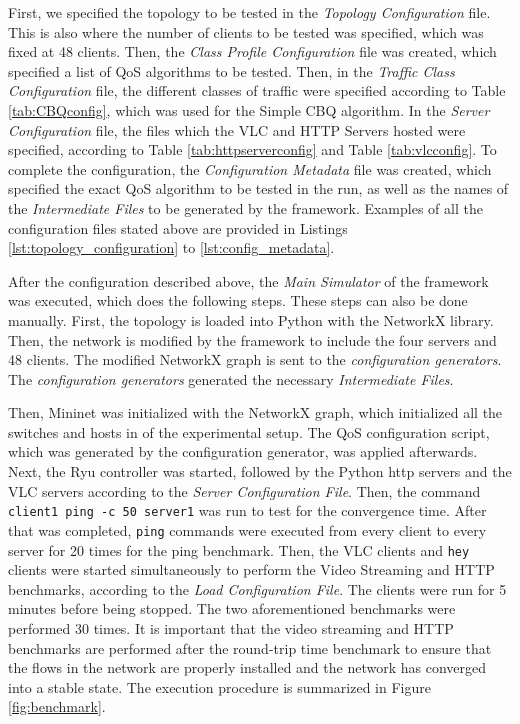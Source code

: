 First, we specified the topology to be tested in the \textit{Topology Configuration} file. This is also where the number of clients to be tested was specified, which was fixed at 48 clients. Then, the \textit{Class Profile Configuration} file was created, which specified a list of QoS algorithms to be tested. Then, in the \textit{Traffic Class Configuration} file, the different classes of traffic were specified according to Table \ref{tab:CBQconfig}, which was used for the Simple CBQ algorithm. In the \textit{Server Configuration} file, the files which the VLC and HTTP Servers hosted were specified, according to Table \ref{tab:httpserverconfig} and Table \ref{tab:vlcconfig}. To complete the configuration, the \textit{Configuration Metadata} file was created, which specified the exact QoS algorithm to be tested in the run, as well as the names of the \textit{Intermediate Files} to be generated by the framework. Examples of all the configuration files stated above are provided in Listings \ref{lst:topology_configuration} to \ref{lst:config_metadata}.

After the configuration described above, the \textit{Main Simulator} of the framework was executed, which does the following steps. These steps can also be done manually. First, the topology is loaded into Python with the NetworkX library. Then, the network is modified by the framework to include the four servers and 48 clients. The modified NetworkX graph is sent to the \textit{configuration generators}. The \textit{configuration generators} generated the necessary \textit{Intermediate Files}. 

Then, Mininet was initialized with the NetworkX graph, which initialized all the switches and hosts in of the experimental setup. The QoS configuration script, which was generated by the configuration generator, was applied afterwards. Next, the Ryu controller was started, followed by the Python http servers and the VLC servers according to the \textit{Server Configuration File}. Then, the command \texttt{client1 ping -c 50 server1} was run to test for the convergence time. After that was completed, \texttt{ping} commands were executed from every client to every server for 20 times for the ping benchmark. Then, the VLC clients and \texttt{hey} clients were started simultaneously to perform the Video Streaming and HTTP benchmarks, according to the \textit{Load Configuration File}. The clients were run for 5 minutes before being stopped. The two aforementioned benchmarks were performed 30 times. It is important that the video streaming and HTTP benchmarks are performed after the round-trip time benchmark to ensure that the flows in the network are properly installed and the network has converged into a stable state. The execution procedure is summarized in Figure \ref{fig:benchmark}.

